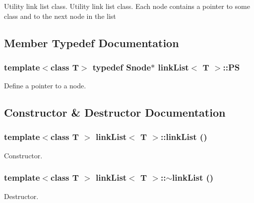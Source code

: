 Utility link list class. Utility link list class. Each node contains a pointer to some class and to the next node in the list 

\subsection{Member Typedef Documentation}
\hypertarget{classlink_list_a03208c95c5a7c4e6d620673a45fdd75b}{
\subsubsection[{PS}]{\setlength{\rightskip}{0pt plus 5cm}template$<$class T$>$ typedef {\bf Snode}$\ast$ {\bf linkList}$<$ T $>$::{\bf PS}}}
\label{classlink_list_a03208c95c5a7c4e6d620673a45fdd75b}


Define a pointer to a node. 

\subsection{Constructor \& Destructor Documentation}
\hypertarget{classlink_list_a2b2193978ecc7fa7a28d194239402fcc}{
\subsubsection[{linkList}]{\setlength{\rightskip}{0pt plus 5cm}template$<$class T $>$ {\bf linkList}$<$ T $>$::{\bf linkList} ()}}
\label{classlink_list_a2b2193978ecc7fa7a28d194239402fcc}


Constructor. \hypertarget{classlink_list_a0b120ae1c3c93e3d0d3fe32b704bb6a1}{
\subsubsection[{$\sim$linkList}]{\setlength{\rightskip}{0pt plus 5cm}template$<$class T $>$ {\bf linkList}$<$ T $>$::$\sim${\bf linkList} ()}}
\label{classlink_list_a0b120ae1c3c93e3d0d3fe32b704bb6a1}


Destructor. 

